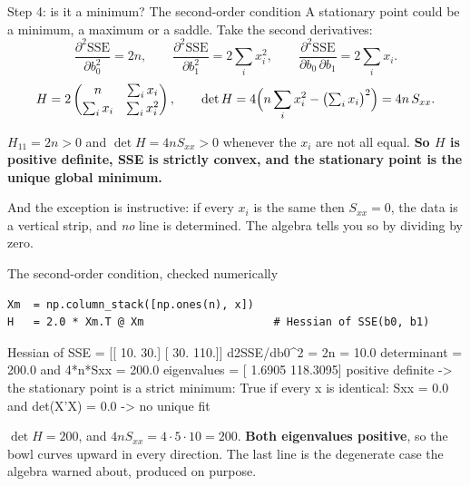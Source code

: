 \documentclass[aspectratio=169]{beamer}
\begin{document}
\begin{frame}[shrink=4]{Step 4: is it a minimum? The second-order condition}
  A stationary point could be a minimum, a maximum or a saddle. Take the
  second derivatives:
  \[
    \frac{\partial^2 \mathrm{SSE}}{\partial b_0^2} = 2n,\qquad
    \frac{\partial^2 \mathrm{SSE}}{\partial b_1^2} = 2\sum_i x_i^2,\qquad
    \frac{\partial^2 \mathrm{SSE}}{\partial b_0\,\partial b_1} =
      2\sum_i x_i .
  \]
  \[
    H = 2\begin{pmatrix} n & \sum_i x_i\\[2pt] \sum_i x_i & \sum_i x_i^2
      \end{pmatrix},
    \qquad
    \det H = 4\Bigl(n\sum_i x_i^2 - \bigl(\textstyle\sum_i x_i\bigr)^2\Bigr)
           = 4n\,S_{xx}.
  \]
  \begin{exampleblock}{}
    \centering
    $H_{11} = 2n > 0$ and $\det H = 4nS_{xx} > 0$ whenever the $x_i$ are not
    all equal. \textbf{So $H$ is positive definite, SSE is strictly convex,
    and the stationary point is the unique global minimum.}
  \end{exampleblock}
  \begin{center}\small
    And the exception is instructive: if every $x_i$ is the same then
    $S_{xx} = 0$, the data is a vertical strip, and \emph{no} line is
    determined. The algebra tells you so by dividing by zero.
  \end{center}
\end{frame}

\begin{frame}[fragile,shrink=6]{The second-order condition, checked numerically}
\begin{lstlisting}
Xm  = np.column_stack([np.ones(n), x])
H   = 2.0 * Xm.T @ Xm                    # Hessian of SSE(b0, b1)
\end{lstlisting}
\begin{outblk}
Hessian of SSE =
 [[ 10.  30.]
 [ 30. 110.]]
d2SSE/db0^2 = 2n      = 10.0
determinant           = 200.0
and 4*n*Sxx           = 200.0
eigenvalues           = [  1.6905 118.3095]
positive definite -> the stationary point is a strict minimum: True
if every x is identical: Sxx = 0.0 and det(X'X) = 0.0 -> no unique fit
\end{outblk}
\begin{center}\small
  $\det H = 200$, and $4nS_{xx} = 4\cdot 5\cdot 10 = 200$. \textbf{Both
  eigenvalues positive}, so the bowl curves upward in every direction. The
  last line is the degenerate case the algebra warned about, produced on
  purpose.
\end{center}
\end{frame}
\end{document}
